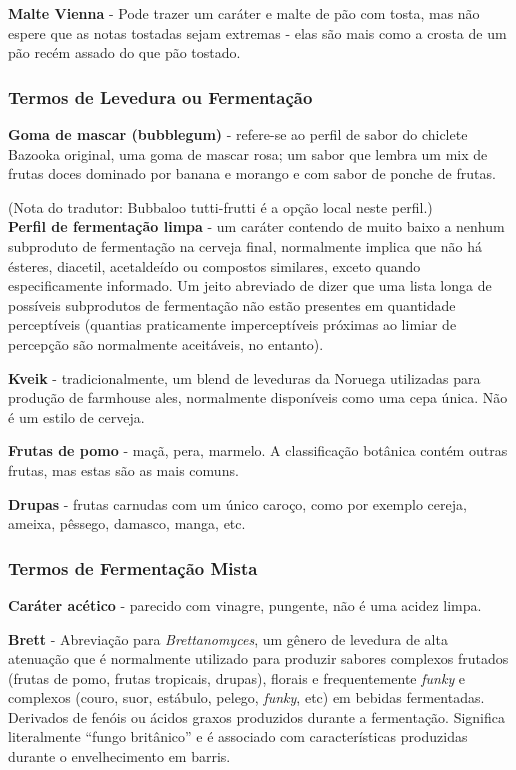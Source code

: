 \textbf{Malte Vienna} - Pode trazer um caráter e malte de pão com tosta, mas não espere que as notas tostadas sejam extremas - elas são mais como a crosta de um pão recém assado do que pão tostado.
\subsubsection*{Termos de Levedura ou Fermentação}
\textbf{Goma de mascar (bubblegum)} - refere-se ao perfil de sabor do chiclete Bazooka original, uma goma de mascar rosa; um sabor que lembra um mix de frutas doces dominado por banana e morango e com sabor de ponche de frutas.

(Nota do tradutor: Bubbaloo tutti-frutti é a opção local neste perfil.)\\
\textbf{Perfil de fermentação limpa} - um caráter contendo de muito baixo a nenhum subproduto de fermentação na cerveja final, normalmente implica que não há ésteres, diacetil, acetaldeído ou compostos similares, exceto quando especificamente informado. Um jeito abreviado de dizer que uma lista longa de possíveis subprodutos de fermentação não estão presentes em quantidade perceptíveis (quantias praticamente imperceptíveis próximas ao limiar de percepção são normalmente aceitáveis, no entanto).

\textbf{Kveik} - tradicionalmente, um blend de leveduras da Noruega utilizadas para produção de farmhouse ales, normalmente disponíveis como uma cepa única. Não é um estilo de cerveja.

\textbf{Frutas de pomo} - maçã, pera, marmelo. A classificação botânica contém outras frutas, mas estas são as mais comuns.

\textbf{Drupas} - frutas carnudas com um único caroço, como por exemplo cereja, ameixa, pêssego, damasco, manga, etc.
\subsubsection*{Termos de Fermentação Mista}
\textbf{Caráter acético} - parecido com vinagre, pungente, não é uma acidez limpa.

\textbf{Brett} - Abreviação para \textit{Brettanomyces}, um gênero de levedura de alta atenuação que é normalmente utilizado para produzir sabores complexos frutados (frutas de pomo, frutas tropicais, drupas), florais e frequentemente \textit{funky} e complexos (couro, suor, estábulo, pelego, \textit{funky}, etc) em bebidas fermentadas. Derivados de fenóis ou ácidos graxos produzidos durante a fermentação. Significa literalmente “fungo britânico” e é associado com características produzidas durante o envelhecimento em barris.

